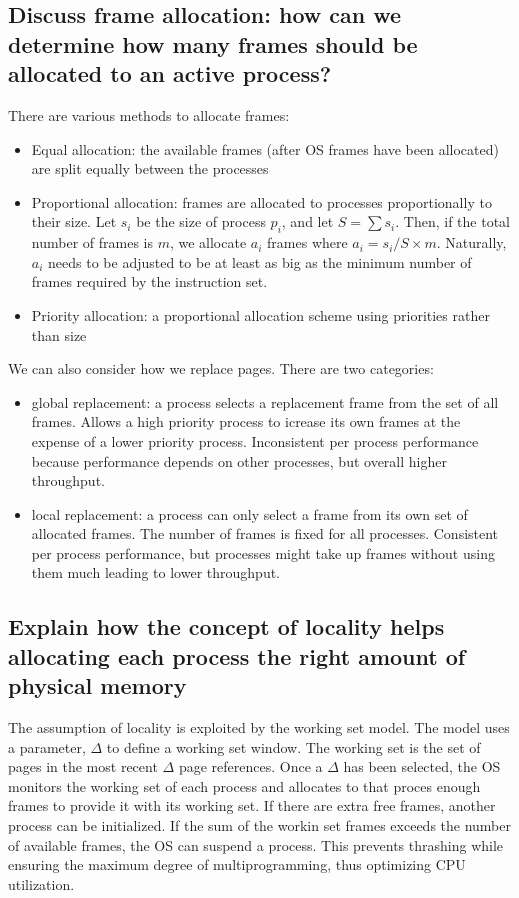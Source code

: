 \documentclass{article}
\begin{document}
\subsection{Discuss frame allocation: how can we determine how many frames should be allocated to an active process?}
There are various methods to allocate frames: \begin{itemize}
    \item Equal allocation: the available frames (after OS frames have been allocated) are split equally between the processes
    \item Proportional allocation: frames are allocated to processes proportionally to their size. Let $s_i$ be the size of process $p_i$, and let $S=\sum s_i$. Then, if the total number of frames is $m$, we allocate $a_i$ frames where $a_i=s_i/S\times m$. Naturally, $a_i$ needs to be adjusted to be at least as big as the minimum number of frames required by the instruction set.
    \item Priority allocation: a proportional allocation scheme using priorities rather than size
\end{itemize} 
We can also consider how we replace pages. There are two categories:\begin{itemize}
    \item global replacement: a process selects a replacement frame from the set of all frames. Allows a high priority process to icrease its own frames at the expense of a lower priority process. Inconsistent per process performance because performance depends on other processes, but overall higher throughput.
    \item local replacement: a process can only select a frame from its own set of allocated frames. The number of frames is fixed for all processes. Consistent per process performance, but processes might take up frames without using them much leading to lower throughput.
\end{itemize}

\subsection{Explain how the concept of locality helps allocating each process the right amount of physical memory}
The assumption of locality is exploited by the working set model. The model uses a parameter, $\Delta$ to define a working set window. The working set is the set of pages in the most recent $\Delta$ page references. Once a $\Delta$ has been selected, the OS monitors the working set of each process and allocates to that proces enough frames to provide it with its working set. If there are extra free frames, another process can be initialized. If the sum of the workin set frames exceeds the number of available frames, the OS can suspend a process. This prevents thrashing while ensuring the maximum degree of multiprogramming, thus optimizing CPU utilization.
\end{document}
